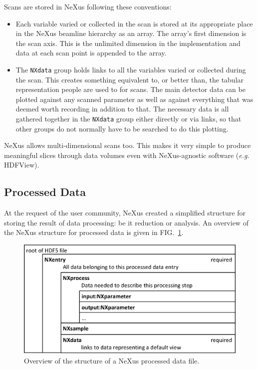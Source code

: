 \documentclass[%
 aip,
rsi,
 amsmath,amssymb,
 reprint,%
]{revtex4-1}
\begin{document}
Scans are stored in NeXus following these conventions: 
\begin{itemize}
\item Each variable varied or collected in the scan is stored at its appropriate place in the NeXus beamline 
 hierarchy as an array. The array's first dimension is the scan axis. This is the unlimited dimension in 
 the implementation and data at each scan point is appended to the array. 
\item The \texttt{NXdata} group holds links to all the variables varied or collected during the scan. 
 This creates something equivalent to, or better than, the tabular representation people are used to for scans. 
 The main detector data can be plotted against any scanned parameter as well as against everything that was 
 deemed worth recording in addition to that.  The necessary data is all gathered together in the \texttt{NXdata}
 group either directly or via links, so that other groups do not
 normally have to be searched to do this plotting.
 
\end{itemize}

NeXus allows multi-dimensional scans too. This makes it very simple to produce meaningful slices through data 
volumes even with NeXus-agnostic software ({\it e.g.} HDFView\cite{hdfview}). 



\subsection{Processed Data}

At the request of the user community, NeXus created a simplified structure for storing the result of data 
processing: be it reduction or analysis. 
An overview of the NeXus structure for processed data is given in FIG.~\ref{procfile}. 

\begin{figure}
\includegraphics[width=\columnwidth]{figure3}
\caption{\label{procfile}Overview of the structure of a NeXus processed data file.}
\end{figure}
\end{document}

